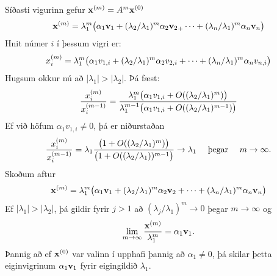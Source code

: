 \documentclass[letterpaper,10pt,icelandic]{sphinxmanual}
\begin{document}
Síðasti vigurinn gefur \({\bf x}^{(m)} = A^m {\bf x}^{(0)}\)
\begin{gather}
\begin{split}{\mbox{${\bf x}$}}^{(m)}=  \lambda_1^m
\big(\alpha_1{\mbox{${\bf v}$}}_1+(\lambda_2/\lambda_1)^m\alpha_2{\mbox{${\bf v}_2$}}_+\cdots+
(\lambda_n/\lambda_1)^m \alpha_n{\mbox{${\bf v}$}}_n\big)\end{split}\notag
\end{gather}
Hnit númer \(i\) í þessum vigri er:
\begin{gather}
\begin{split}x_i^{(m)}=  \lambda_1^m
\big(\alpha_1v_{1,i}+(\lambda_2/\lambda_1)^m\alpha_2v_{2,i}+\cdots+
(\lambda_n/\lambda_1)^m \alpha_nv_{n,i}\big)\end{split}\notag
\end{gather}
Hugsum okkur nú að \(|\lambda_1|>|\lambda_2|\). Þá fæst:
\begin{gather}
\begin{split}\dfrac{x_i^{(m)}}{x_i^{(m-1)}}
=
\dfrac{\lambda_1^m\big(\alpha_1v_{1,i}+O((\lambda_2/\lambda_1)^m)\big)}
{\lambda_1^{m-1}\big(\alpha_1v_{1,i}+O((\lambda_2/\lambda_1)^{m-1})\big)}\end{split}\notag
\end{gather}
Ef við höfum \(\alpha_1v_{1,i}\neq 0\), þá er niðurstaðan
\begin{gather}
\begin{split}\dfrac{x_i^{(m)}}{x_i^{(m-1)}}
=\lambda_1
\dfrac{\big(1+O((\lambda_2/\lambda_1)^m)\big)}
{\big(1+O((\lambda_2/\lambda_1))^{m-1}\big)} \to \lambda_1
\quad \text{ þegar }  \quad m\to \infty.\end{split}\notag
\end{gather}
Skoðum aftur
\begin{gather}
\begin{split}{\mbox{${\bf x}$}}^{(m)}=  \lambda_1^m
\big(\alpha_1{\mbox{${\bf v}$}}_1+(\lambda_2/\lambda_1)^m\alpha_2{\mbox{${\bf v}$}}_2+\cdots+
(\lambda_n/\lambda_1)^m \alpha_n{\mbox{${\bf v}$}}_n\big)\end{split}\notag
\end{gather}
Ef \(|\lambda_1|>|\lambda_2|\), þá gildir fyrir \(j > 1\) að
\((\lambda_j/\lambda_1)^m \to 0\) þegar \(m \to \infty\) og
\begin{gather}
\begin{split}\lim_{m\to \infty} \frac{{\mbox{${\bf x}$}}^{(m)}}{\lambda_1^m} = \alpha_1 {\mbox{${\bf v}$}}_1.\end{split}\notag
\end{gather}
Þannig að ef \({\mbox{${\bf x}$}}^{(0)}\) var valinn í upphafi
þannig að \(\alpha_1 \neq 0\), þá skilar þetta eiginvigrinum
\(\alpha_1{\mbox{${\bf v}$}}_1\) fyrir eigingildið
\(\lambda_1\).
\end{document}
